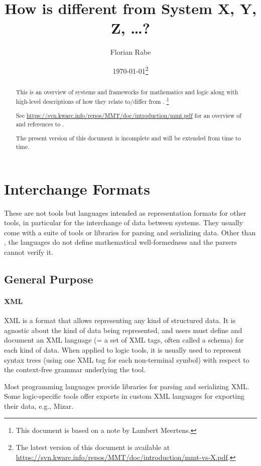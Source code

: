 \documentclass[12pt]{article}
\newcommand{\system}[2][]{\paragraph{#2}#2 \ifnonempty[\cite{#2}]{#1}{\cite{#1}}}
\begin{document}
\title{How is \mmt different from System X, Y, Z, \ldots ?}
\author{Florian Rabe}
\date{\today\footnote{The latest version of this document is available at \url{https://svn.kwarc.info/repos/MMT/doc/introduction/mmt-vs-X.pdf}.}}
\maketitle

\begin{abstract}
This is an overview of systems and frameworks for mathematics and logic along with high-level descriptions of how they relate to/differ from \mmt.
\footnote{This document is based on a note by Lambert Meertens.}

See \url{https://svn.kwarc.info/repos/MMT/doc/introduction/mmt.pdf} for an overview of and references to \mmt.

The present version of this document is incomplete and will be extended from time to time.
\end{abstract}

\section{Interchange Formats}

These are not tools but languages intended as representation formats for other tools, in particular for the interchange of data between systems.
They usually come with a suite of tools or libraries for parsing and serializing data.
Other than \mmt, the languages do not define mathematical well-formedness and the parsers cannot verify it.

\subsection{General Purpose}

\system{XML}
is a format that allows representing any kind of structured data.
It is agnostic about the kind of data being represented, and users must define and document an XML language (= a set of XML tags, often called a schema) for each kind of data.
When applied to logic tools, it is usually used to represent syntax trees (using one XML tag for each non-terminal symbol) with respect to the context-free grammar underlying the tool.

Most programming languages provide libraries for parsing and serializing XML.
Some logic-specific tools offer exports in custom XML languages for exporting their data, e.g., Mizar.
\end{document}
